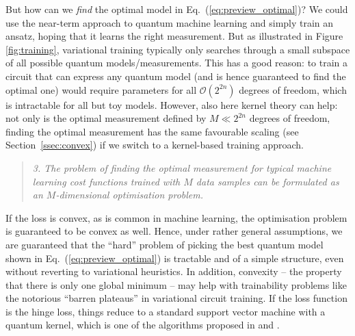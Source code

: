 \documentclass[aps, reprint, onecolumn, nofootinbib, longbibliography]{revtex4-2}
\begin{document}
But how can we \textit{find} the optimal model in Eq.~(\ref{eq:preview_optimal})? We could use the near-term approach to quantum machine learning and simply train an ansatz, hoping that it learns the right measurement. But as illustrated in Figure \ref{fig:training}, variational training typically only searches through a small subspace of all possible quantum models/measurements. This has a good reason: to train a circuit that can express any quantum model (and is hence guaranteed to find the optimal one) would require parameters for all $\mathcal{O}(2^{2n})$ degrees of freedom, which is intractable for all but toy models. However, also here kernel theory can help: not only is the optimal measurement defined by $M \ll 2^{2n}$ degrees of freedom, finding the optimal measurement has the same favourable scaling (see Section~\ref{ssec:convex}) if we switch to a kernel-based training approach.
\begin{quote} 
    \textit{3. The problem of finding the optimal measurement for typical machine learning cost functions trained with $M$ data samples can be formulated as an $M$-dimensional optimisation problem. }
\end{quote}
If the loss is convex, as is common in machine learning, the optimisation problem is guaranteed to be convex as well. Hence, under rather general assumptions, we are guaranteed that the ``hard'' problem of picking the best quantum model shown in Eq.~(\ref{eq:preview_optimal}) is tractable and of a simple structure, even without reverting to variational heuristics. In addition, convexity -- the property that there is only one global minimum -- may help with trainability problems like the notorious ``barren plateaus'' \citep{mcclean2018barren} in variational circuit training. If the loss function is the hinge loss, things reduce to a standard support vector machine with a quantum kernel, which is one of the algorithms proposed in \cite{schuld2019quantum} and \cite{havlivcek2019supervised}. 
\end{document}
